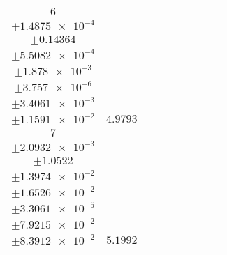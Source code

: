 \documentclass[8pt]{article}
\begin{document}
\begin{longtable}[l]{c c c c c c c c c}
$\num{6}$ & \begin{tabular}[c]{@{}c@{}}$\num{6.0062e-2}$ \\ $\pm\num{1.4875e-4}$\end{tabular} & \begin{tabular}[c]{@{}c@{}}$\num{-0.23848}$ \\ $\pm\num{0.14364}$\end{tabular} & \begin{tabular}[c]{@{}c@{}}$\num{6.9993}$ \\ $\pm\num{5.5082e-4}$\end{tabular} & \begin{tabular}[c]{@{}c@{}}$\num{1.5728e+3}$ \\ $\pm\num{1.878e-3}$\end{tabular} & \begin{tabular}[c]{@{}c@{}}$\num{3.1465}$ \\ $\pm\num{3.757e-6}$\end{tabular} & \begin{tabular}[c]{@{}c@{}}$\num{1.1659}$ \\ $\pm\num{3.4061e-3}$\end{tabular} & \begin{tabular}[c]{@{}c@{}}$\num{4.1968}$ \\ $\pm\num{1.1591e-2}$\end{tabular} & $\num{4.9793}$\\
$\num{7}$ & \begin{tabular}[c]{@{}c@{}}$\num{8.8381e-2}$ \\ $\pm\num{2.0932e-3}$\end{tabular} & \begin{tabular}[c]{@{}c@{}}$\num{-0.82565}$ \\ $\pm\num{1.0522}$\end{tabular} & \begin{tabular}[c]{@{}c@{}}$\num{4.2286e-3}$ \\ $\pm\num{1.3974e-2}$\end{tabular} & \begin{tabular}[c]{@{}c@{}}$\num{1.5745e+3}$ \\ $\pm\num{1.6526e-2}$\end{tabular} & \begin{tabular}[c]{@{}c@{}}$\num{3.1499}$ \\ $\pm\num{3.3061e-5}$\end{tabular} & \begin{tabular}[c]{@{}c@{}}$\num{5.7971}$ \\ $\pm\num{7.9215e-2}$\end{tabular} & \begin{tabular}[c]{@{}c@{}}$\num{8.4613}$ \\ $\pm\num{8.3912e-2}$\end{tabular} & $\num{5.1992}$\\

\end{longtable}
\end{document}
